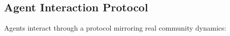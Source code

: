 \subsection{Agent Interaction Protocol}

% 
% 
% 
% 
% 
Agents interact through a protocol mirroring real community dynamics:


